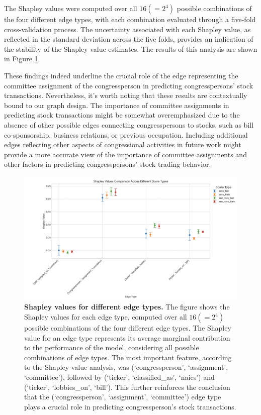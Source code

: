 \documentclass[15pt,letterpaper]{article}
\begin{document}
The Shapley values were computed over all $16 (=2^4)$ possible combinations of the four different edge types, with each combination evaluated through a five-fold cross-validation process. The uncertainty associated with each Shapley value, as reflected in the standard deviation across the five folds, provides an indication of the stability of the Shapley value estimates. The results of this analysis are shown in Figure \ref{fig:shap_values}.

These findings indeed underline the crucial role of the edge representing the committee assignment of the congressperson in predicting congresspersons' stock transactions. Nevertheless, it's worth noting that these results are contextually bound to our graph design. The importance of committee assignments in predicting stock transactions might be somewhat overemphasized due to the absence of other possible edges connecting congresspersons to stocks, such as bill co-sponsorship, business relations, or previous occupation. Including additional edges reflecting other aspects of congressional activities in future work might provide a more accurate view of the importance of committee assignments and other factors in predicting congresspersons' stock trading behavior.

\begin{figure}[h!]
  \centering
  \includegraphics[width=1.1\textwidth, height=0.4\textheight]{imgs/shapeee.png}
  \caption{\textbf{Shapley values for different edge types.} The figure shows the Shapley values for each edge type, computed over all $16 (=2^4)$ possible combinations of the four different edge types. The Shapley value for an edge type represents its average marginal contribution to the performance of the model, considering all possible combinations of edge types. The most important feature, according to the Shapley value analysis, was (`congressperson', `assignment', `committee'), followed by (`ticker', `classified\_as', `naics') and (`ticker', `lobbies\_on', `bill'). This further reinforces the conclusion that the (`congressperson', `assignment', `committee') edge type plays a crucial role in predicting congressperson's stock transactions.}
  \label{fig:shap_values}
\end{figure}
\end{document}
